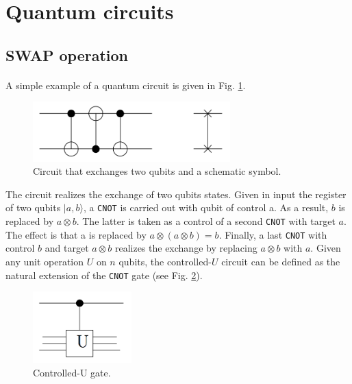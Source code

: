 \documentclass[a4paper,10pt]{article}
\begin{document}
\newpage

\section{Quantum circuits}

\subsection{SWAP operation}

\paragraph{} A simple example of a quantum circuit is given in Fig. \ref{circuit}. 
\begin{figure}[!htb]
\begin{center}
\includegraphics[width=3.0in]{images/circuit.png}
\caption{Circuit that exchanges two qubits and a schematic symbol.}
\label{circuit}
\end{center}
\end{figure}

The circuit realizes the exchange of two qubits states. Given in input the register of two qubits $|a, b\rangle$, a \texttt{CNOT} is carried out with qubit of control a. As a result, $b$ is replaced by $a \otimes b$. The latter is taken as a control of a second \texttt{CNOT} with target $a$. The effect is that a is replaced by $a \otimes (a \otimes b) = b$. Finally, a last \texttt{CNOT} with control $b$ and target $a \otimes b$ realizes the exchange by replacing $a \otimes b$ with $a$. Given any unit operation $U$ on $n$ qubits, the controlled-$U$ circuit can be defined as the natural extension of the \texttt{CNOT} gate (see Fig. \ref{controlledu}). 
\begin{figure}[!htb]
\begin{center}
\includegraphics[width=1.5in]{images/controlledu.png}
\caption{Controlled-U gate.}
\label{controlledu}
\end{center}
\end{figure}
\end{document}
